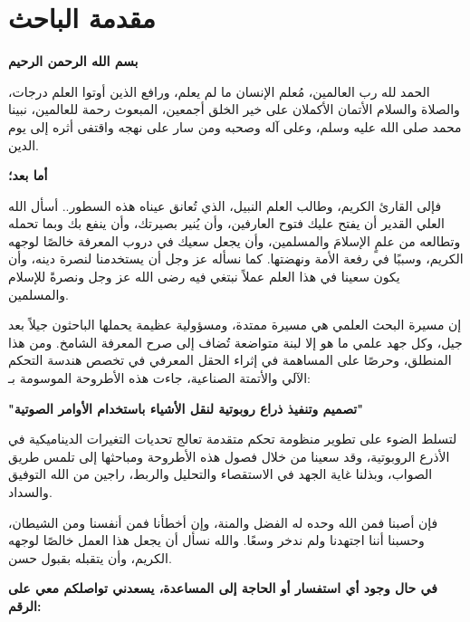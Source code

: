 \chapter*{مقدمة الباحث}

\textbf{بسم الله الرحمن الرحيم}

الحمد لله رب العالمين، مُعلم الإنسان ما لم يعلم، ورافع الذين أوتوا العلم درجات، والصلاة والسلام الأتمان الأكملان على خير الخلق أجمعين، المبعوث رحمة للعالمين، نبينا محمد صلى الله عليه وسلم، وعلى آله وصحبه ومن سار على نهجه واقتفى أثره إلى يوم الدين.

\textbf{أما بعد؛}

فإلى القارئ الكريم، وطالب العلم النبيل، الذي تُعانق عيناه هذه السطور.. أسأل الله العلي القدير أن يفتح عليك فتوح العارفين، وأن يُنير بصيرتك، وأن ينفع بك وبما تحمله وتطالعه من علمٍ الإسلامَ والمسلمين، وأن يجعل سعيك في دروب المعرفة خالصًا لوجهه الكريم، وسببًا في رفعة الأمة ونهضتها. كما نسأله عز وجل أن يستخدمنا لنصرة دينه، وأن يكون سعينا في هذا العلم عملاً نبتغي فيه رضى الله عز وجل ونصرةً للإسلام والمسلمين.

إن مسيرة البحث العلمي هي مسيرة ممتدة، ومسؤولية عظيمة يحملها الباحثون جيلاً بعد جيل، وكل جهد علمي ما هو إلا لبنة متواضعة تُضاف إلى صرح المعرفة الشامخ. ومن هذا المنطلق، وحرصًا على المساهمة في إثراء الحقل المعرفي في تخصص هندسة التحكم الآلي والأتمتة الصناعية، جاءت هذه الأطروحة الموسومة بـ:

\begin{center}
\textbf{"تصميم وتنفيذ ذراع روبوتية لنقل الأشياء باستخدام الأوامر الصوتية"}
\end{center}

لتسلط الضوء على تطوير منظومة تحكم متقدمة تعالج تحديات التغيرات الديناميكية في الأذرع الروبوتية،  وقد سعينا من خلال فصول هذه الأطروحة ومباحثها إلى تلمس طريق الصواب، وبذلنا غاية الجهد في الاستقصاء والتحليل والربط، راجين من الله التوفيق والسداد.

فإن أصبنا فمن الله وحده له الفضل والمنة، وإن أخطأنا فمن أنفسنا ومن الشيطان، وحسبنا أننا اجتهدنا ولم ندخر وسعًا. والله نسأل أن يجعل هذا العمل خالصًا لوجهه الكريم، وأن يتقبله بقبول حسن.

\vspace{1.5cm}
\begin{center}
\textbf{في حال وجود أي استفسار أو الحاجة إلى المساعدة، يسعدني تواصلكم معي على الرقم:}\\
\vspace{0.3cm}
\textbf{}
\end{center}